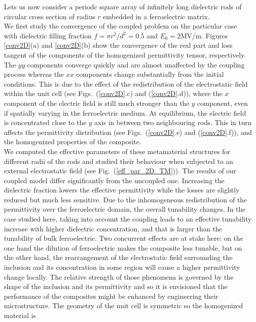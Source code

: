\documentclass[%
 aip,
 amsmath,amssymb,
 reprint,%
linenumbers
]{revtex4-1}
\newcommand{\fig}[1]{Fig.~(\ref{#1})}
\begin{document}
Lets us now consider a periodc square array of infinitely long dielectric rods of circular cross section
of radius $r$ embedded in a ferroelectric matrix.\\
We first study the convergence of the coupled problem on the particular case with dielectric
filling fraction $f=\pi r^2/d^2=0.5$ and $E_0=2$MV/m. Figures \ref{conv2D}(a) and \ref{conv2D}(b) show the
convergence of the real part and loss tangent of the components of the homogenized
permittivity tensor, respectively. The $yy$ components converge quickly
and are almost unaffected by the coupling process whereas the
$xx$ components change substantially from the initial conditions.
This is due to the effect of the redistribution
of the electrostatic field within the unit cell (see Figs.~(\ref{conv2D}.c) and (\ref{conv2D}.d)),
where the $x$ component of the electric field is still much stronger
than the $y$ component, even if spatially varying in the ferroelectric medium.
At equilibrium, the electric field is concentrated close to the $y$ axis in between two neighbouring
rods. This in turn affects the permittivity distribution (see Figs.~(\ref{conv2D}.e) and (\ref{conv2D}.f)),
and the homogenized properties of the composite.\\
We computed the effective parameters of these metamaterial structures for different
radii of the rods and studied their behaviour when subjected to an external
electrostatic field (see \fig{eff_par_2D_TM}). The results of our coupled
model differ significantly from the uncoupled one. Increasing the dielectric fraction
lowers the effective permittivity while the losses are slightly reduced but much less sensitive.
Due to the inhomogeneous redistribution of the permittivity over the ferroelectric domain, the
overall tunability changes. In the case studied here, taking into account
the coupling leads to an effective tunability increase with
higher dielectric concentration, and that is larger than the tunability
 of bulk ferroelectric. Two concurrent effects are at stake here: on the one hand
the dilution of ferroelectric makes the composite less tunable, but on the other hand,
the rearrangement of the electrostatic field surrounding the inclusion and its
concentration in some region will cause a higher permittivity change locally.
The relative strength of those phenomena is governed by the shape of the inclusion and its permittivity
and so it is envisioned that the performance of the composites might be enhanced by engineering
their microstructure.
The geometry of the unit cell is symmetric so the homogenized material is
\end{document}
